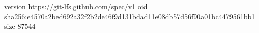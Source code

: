 version https://git-lfs.github.com/spec/v1
oid sha256:e4570a2bed692a32f2b2de46f9d131bdad11e08db57d56f90a01bc4479561bb1
size 87544
